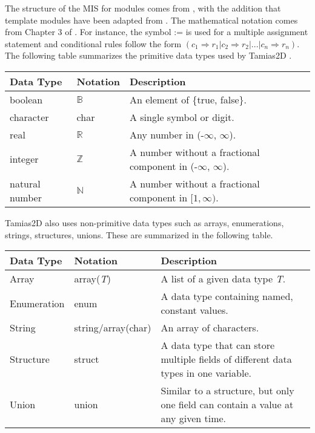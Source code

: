 \documentclass[12pt]{article}
\newcommand{\progname}{Tamias2D }
\begin{document}
The structure of the MIS for modules comes from \citet{HoffmanAndStrooper1995} ,
with the addition that template modules have been adapted from
\cite{GhezziEtAl2003} .  The mathematical notation comes from Chapter 3 of
\citet{HoffmanAndStrooper1995} .  
For instance, the symbol := is used for a
multiple assignment statement and conditional rules follow the form $(c_1
\Rightarrow r_1 | c_2 \Rightarrow r_2 | ... | c_n \Rightarrow r_n )$.\\

The following table summarizes the primitive data types used by \progname. 

\renewcommand*{\arraystretch}{1.2}
\noindent  \begin{longtable}{l l p{10.5cm}} 
\toprule 
\textbf{Data Type} & \textbf{Notation} & \textbf{Description} \\ 
\midrule
boolean & $\mathbb{B}$ & An element of \{true, false\}. \\
character & char & A single symbol or digit. \\
real & $\mathbb{R}$ & Any number in (-$\infty$, $\infty$). \\
integer & $\mathbb{Z}$ & A number without a fractional
  component in (-$\infty$, $\infty$). \\
natural number & $\mathbb{N}$ & A number without a fractional
  component in $[1, \infty)$. \\
\bottomrule
\end{longtable} 

\noindent \progname also uses non-primitive data types such as arrays,
enumerations, strings, structures, unions. These are
summarized in the following table.


\renewcommand*{\arraystretch}{1.2}
\noindent \begin{longtable}{l l p{9.5cm}}
\toprule
	\textbf{Data Type} & \textbf{Notation} & \textbf{Description} \\
\midrule
	Array & array(\textit{T}) & A list of a given data type \textit{T}. \\
	Enumeration & enum & A data type containing named, constant values. \\
	String & string/array(char) & An array of characters. \\
	Structure & struct & A data type that can store multiple fields of different data types in one variable. \\
	Union & union & Similar to a structure, but only one field can contain a value at any given time. \\
	\bottomrule
\end{longtable}
\end{document}
